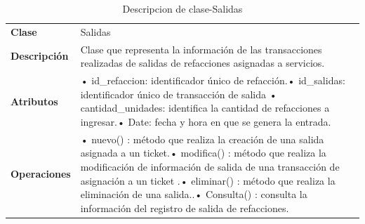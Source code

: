 \begin{table}[H]
	\centering
	\caption{Descripcion de clase-Salidas}
	\begin{tabular}{|p{6.145em}|p{28.07em}|}
		\toprule
		\rowcolor[rgb]{ .125,  .216,  .392} \multicolumn{2}{|p{34.215em}|}{\textcolor[rgb]{ 1,  1,  1}{\textbf{Clase Salidas  }}} \\
		\midrule
		\textbf{Clase} & \multicolumn{1}{l|}{Salidas  } \\
		\midrule
		\textbf{Descripción} & Clase que representa la información de las transacciones realizadas de salidas de refacciones asignadas a servicios.  \\
		\midrule
		\textbf{Atributos } & •	id\_refaccion: identificador único de refacción.\newline{}•	id\_salidas: identificador único de transacción de salida \newline{}•	cantidad\_unidades: identifica la cantidad de refacciones a ingresar.\newline{}•	Date: fecha y hora en que se genera la entrada. \\
		\midrule
		\textbf{Operaciones} & •	nuevo()  :  método que realiza la creación de una salida asignada a un ticket.\newline{}•	modifica() : método que  realiza la modificación de información de salida de una transacción de asignación a un ticket .\newline{}•	eliminar() : método que realiza la eliminación de una salida..\newline{}•	Consulta() : consulta la información del registro de salida de refacciones. \\
		\bottomrule
	\end{tabular}%
	\label{tab:class17}%
\end{table}%


